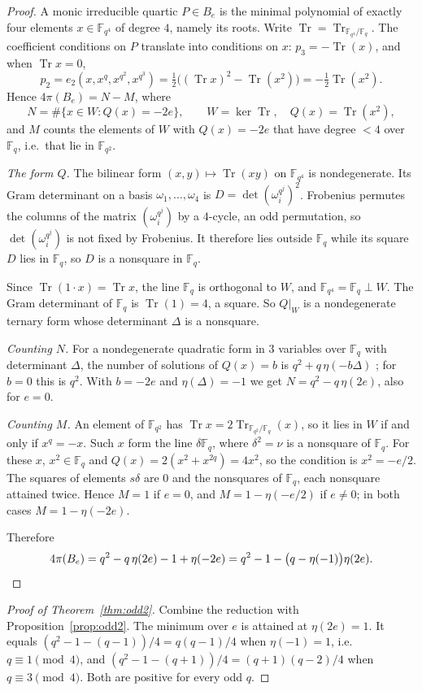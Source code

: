 \documentclass[11pt,a4paper]{amsart}
\theoremstyle{definition}
\theoremstyle{remark}
\newcommand{\F}{\mathbb{F}}
\newcommand{\Tr}{\operatorname{Tr}}
\begin{document}
\begin{proof}
A monic irreducible quartic $P\in B_e$ is the minimal polynomial of exactly four elements $x\in\F_{q^4}$ of degree
$4$, namely its roots. Write $\Tr=\Tr_{\F_{q^4}/\F_q}$. The coefficient conditions on $P$ translate into conditions on
$x$: $p_3=-\Tr(x)$, and when $\Tr x=0$,
\[
p_2=e_2(x,x^q,x^{q^2},x^{q^3})=\tfrac12\bigl((\Tr x)^2-\Tr(x^2)\bigr)=-\tfrac12\Tr(x^2).
\]
Hence $4\pi(B_e)=N-M$, where
\[
N=\#\{x\in W:Q(x)=-2e\},\qquad W=\ker\Tr,\quad Q(x)=\Tr(x^2),
\]
and $M$ counts the elements of $W$ with $Q(x)=-2e$ that have degree $<4$ over $\F_q$, i.e.\ that lie in
$\F_{q^2}$.

\emph{The form $Q$.} The bilinear form $(x,y)\mapsto\Tr(xy)$ on $\F_{q^4}$ is nondegenerate. Its Gram determinant on
a basis $\omega_1,\dots,\omega_4$ is $D=\det(\omega_i^{q^{j}})^2$. Frobenius permutes the columns of the matrix
$(\omega_i^{q^j})$ by a $4$-cycle, an odd permutation, so $\det(\omega_i^{q^j})$ is not fixed by Frobenius. It
therefore lies outside $\F_q$ while its square $D$ lies in $\F_q$, so $D$ is a nonsquare in $\F_q$.

Since $\Tr(1\cdot x)=\Tr x$, the line $\F_q$ is orthogonal to $W$, and $\F_{q^4}=\F_q\perp W$. The Gram determinant
of $\F_q$ is $\Tr(1)=4$, a square. So $Q|_W$ is a nondegenerate ternary form whose determinant $\Delta$ is a
nonsquare.

\emph{Counting $N$.} For a nondegenerate quadratic form in $3$ variables over $\F_q$ with determinant $\Delta$, the
number of solutions of $Q(x)=b$ is $q^2+q\,\eta(-b\Delta)$ \cite[Thm.~6.27]{LN}; for $b=0$ this is $q^2$. With
$b=-2e$ and $\eta(\Delta)=-1$ we get $N=q^2-q\,\eta(2e)$, also for $e=0$.

\emph{Counting $M$.} An element of $\F_{q^2}$ has $\Tr x=2\Tr_{\F_{q^2}/\F_q}(x)$, so it lies in $W$ if and only if
$x^q=-x$. Such $x$ form the line $\delta\F_q$, where $\delta^2=\nu$ is a nonsquare of $\F_q$. For these $x$,
$x^2\in\F_q$ and $Q(x)=2(x^2+x^{2q})=4x^2$, so the condition is $x^2=-e/2$. The squares of elements $s\delta$ are
$0$ and the nonsquares of $\F_q$, each nonsquare attained twice. Hence $M=1$ if $e=0$, and $M=1-\eta(-e/2)$ if
$e\ne0$; in both cases $M=1-\eta(-2e)$.

Therefore
\[
4\pi(B_e)=q^2-q\,\eta(2e)-1+\eta(-2e)=q^2-1-\bigl(q-\eta(-1)\bigr)\eta(2e). \qedhere
\]
\end{proof}

\begin{proof}[Proof of Theorem~\ref{thm:odd2}]
Combine the reduction with Proposition~\ref{prop:odd2}. The minimum over $e$ is attained at $\eta(2e)=1$. It equals
$(q^2-1-(q-1))/4=q(q-1)/4$ when $\eta(-1)=1$, i.e.\ $q\equiv1\pmod4$, and $(q^2-1-(q+1))/4=(q+1)(q-2)/4$ when
$q\equiv3\pmod4$. Both are positive for every odd $q$.
\end{proof}
\end{document}
